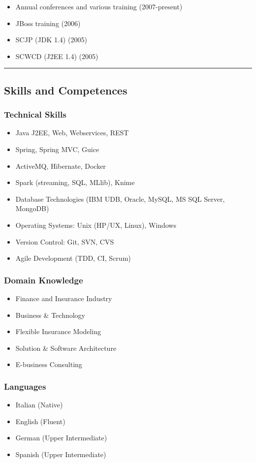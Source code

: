 \begin{itemize}
\tightlist
\item
  Annual conferences and various training (2007-present)
\item
  JBoss training (2006)
\item
  SCJP (JDK 1.4) (2005)
\item
  SCWCD (J2EE 1.4) (2005)
\end{itemize}

\begin{center}\rule{0.5\linewidth}{0.5pt}\end{center}

\subsection{Skills and Competences}\label{skills-and-competences}

\subsubsection{Technical Skills}\label{technical-skills}

\begin{itemize}
\tightlist
\item
  Java J2EE, Web, Webservices, REST
\item
  Spring, Spring MVC, Guice
\item
  ActiveMQ, Hibernate, Docker
\item
  Spark (streaming, SQL, MLlib), Knime
\item
  Database Technologies (IBM UDB, Oracle, MySQL, MS SQL Server, MongoDB)
\item
  Operating Systems: Unix (HP/UX, Linux), Windows
\item
  Version Control: Git, SVN, CVS
\item
  Agile Development (TDD, CI, Scrum)
\end{itemize}

\subsubsection{Domain Knowledge}\label{domain-knowledge}

\begin{itemize}
\tightlist
\item
  Finance and Insurance Industry
\item
  Business \& Technology
\item
  Flexible Insurance Modeling
\item
  Solution \& Software Architecture
\item
  E-business Consulting
\end{itemize}

\subsubsection{Languages}\label{languages}

\begin{itemize}
\tightlist
\item
  Italian (Native)
\item
  English (Fluent)
\item
  German (Upper Intermediate)
\item
  Spanish (Upper Intermediate)
\end{itemize}
